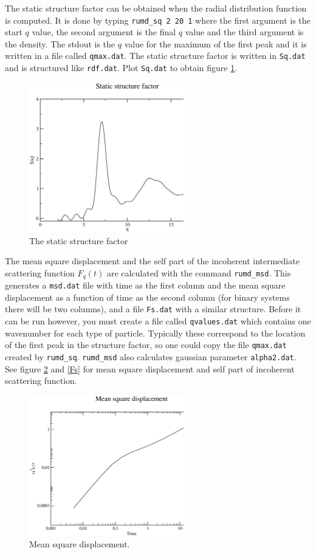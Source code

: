 The static structure factor can be obtained when the radial
distribution function is computed. It is done by typing 
\verb=rumd_sq 2 20 1= 
where the first argument is the start $q$ value, the second
argument is the final $q$ value and the third argument is the
density. The stdout is the $q$ value for the maximum of the first peak
and it is written in a file called \verb=qmax.dat=. The static
structure factor is written in \verb=Sq.dat= and is structured like
\verb=rdf.dat=. Plot \verb=Sq.dat= to obtain figure \ref{LJSq}.\\ 
\begin{figure}[!ht]
\centering
\includegraphics[width=0.6\textwidth]{level1/LJSq}
\caption{The static structure factor}\label{LJSq}
\end{figure}
The mean square displacement and the self part of the
incoherent intermediate scattering function $F_q(t)$ are calculated with 
the command
\verb=rumd_msd=. This generates a \verb=msd.dat= file with time as the
first column and the mean square displacement as a function of time as
the second column (for binary systems there will be two columns), and a file 
\verb|Fs.dat| with a similar structure. Before it can
be run however, you must create a file called \verb|qvalues.dat| which contains
one wavenumber for each type of particle. Typically these correspond to the 
location of the first peak in the structure factor, so one could copy the file
\verb|qmax.dat| created by \verb|rumd_sq|. \verb|rumd_msd| also calculates
gaussian parameter \verb=alpha2.dat=. See figure \ref{msd} and
\ref{Fs} for mean square displacement and self part of incoherent
scattering function.
\begin{figure}[!ht]
\centering
\includegraphics[width=0.6\textwidth]{level1/LJmsd}
\caption{Mean square displacement.}\label{msd}
\end{figure}
